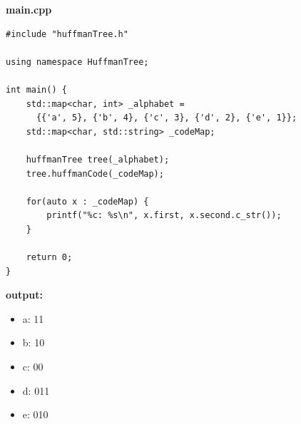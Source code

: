 \documentclass[onecolumn,oneside]{BUPTHomework}
\begin{document}
\begin{solution}
{    \textbf{\textsf{main.cpp}}
\begin{lstlisting}
#include "huffmanTree.h"

using namespace HuffmanTree;

int main() {
    std::map<char, int> _alphabet = 
      {{'a', 5}, {'b', 4}, {'c', 3}, {'d', 2}, {'e', 1}};
    std::map<char, std::string> _codeMap;

    huffmanTree tree(_alphabet);
    tree.huffmanCode(_codeMap);

    for(auto x : _codeMap) {
        printf("%c: %s\n", x.first, x.second.c_str());
    }

    return 0;
}
\end{lstlisting}

    \textbf{\textsf{output:}}
    \begin{itemize}
      \item a: 11
      \item b: 10
      \item c: 00
      \item d: 011
      \item e: 010
    \end{itemize}

  }
  \end{solution}
\end{document}
